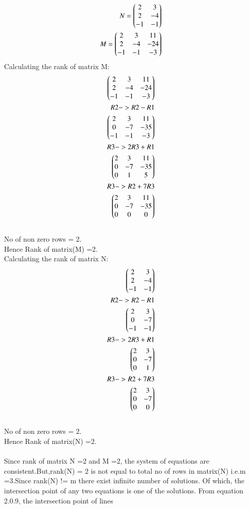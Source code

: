 \documentclass[journal,12pt,twocolumn]{IEEEtran}
\begin{document}
\begin{align*}
N=\begin{pmatrix}2 & 3\\2 & -4\\-1 & -1\end{pmatrix}\\
M=\begin{pmatrix}2 & 3 & 11\\2 & -4 & -24\\-1 & -1 & -3\end{pmatrix}
\end{align*}
Calculating the rank of matrix M:
\begin{align*}
\begin{pmatrix}2 & 3 & 11\\2 & -4 & -24\\-1 & -1 & -3\end{pmatrix}
\\R2 -> R2-R1\\
\begin{pmatrix}2 & 3 & 11\\0 & -7 & -35\\-1 & -1 & -3\end{pmatrix}
\\R3 -> 2R3+R1\\
\begin{pmatrix}2 & 3 & 11\\0 & -7 & -35\\0 & 1 & 5\end{pmatrix}
\\R3 -> R2+7R3\\
\begin{pmatrix}2 & 3 & 11\\0 & -7 & -35\\0 & 0 & 0\end{pmatrix}
\end{align*}
\\No of non zero rows = 2.
\\Hence Rank of matrix(M) =2.
\\Calculating the rank of matrix N:
\begin{align*}
\begin{pmatrix}2 & 3\\2 & -4\\-1 & -1\end{pmatrix}
\\R2 -> R2-R1\\
\begin{pmatrix}2 & 3\\0 & -7\\-1 & -1\end{pmatrix}
\\R3 -> 2R3+R1\\
\begin{pmatrix}2 & 3\\0 & -7\\0 & 1\end{pmatrix}
\\R3 -> R2+7R3\\
\begin{pmatrix}2 & 3\\0 & -7\\0 & 0\end{pmatrix}
\end{align*}
\\No of non zero rows = 2.
\\Hence Rank of matrix(N) =2.\\
\\
Since rank of matrix N =2 and M =2, the system of equations are consistent.But,rank(N) = 2 is not equal to total no of rows in matrix(N) i.e.m =3.Since rank(N) != m there exist infinite number of solutions. Of which, the intersection point of any two equations is one of the solutions. From equation 2.0.9, the intersection point of lines
\end{document}
